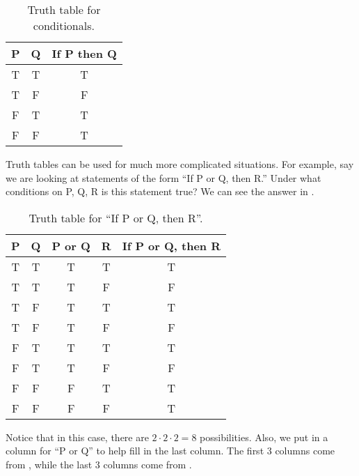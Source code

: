 \documentclass{tufte-book}
\begin{document}
\begin{table}
  \begin{center}
    \begin{tabular}{ccc}
      \toprule
      P & Q & If P then Q \\ \midrule
      T & T & T \\
      T & F & F \\
      F & T & T \\
      F & F & T \\ \bottomrule
    \end{tabular}
  \end{center}
  \caption{Truth table for conditionals.}
  \label{tab:truth-table-conditionals}
\end{table}
Truth tables can be used for much more complicated situations. For example, say we are looking at statements of the form ``If P or Q, then R.'' Under what conditions on P, Q, R is this statement true? We can see the answer in .

\begin{table}
  \begin{center}
    \begin{tabular}{ccccc}
      \toprule
      P & Q & P or Q & R & If P or Q, then R \\ \midrule
      T & T & T & T & T\\
      T & T & T & F & F\\
      T & F & T & T & T\\
      T & F & T & F & F\\ 
      F & T & T & T & T \\
      F & T & T & F & F \\
      F & F & F & T & T \\
      F & F & F & F & T \\
      \bottomrule
    \end{tabular}
  \end{center}
  \caption{Truth table for ``If P or Q, then R''.}
  \label{tab:truth-table-if-p-or-q-then-r}
\end{table}
Notice that in this case, there are $2 \cdot 2 \cdot 2 = 8$ possibilities. Also, we put in a column for ``P or Q'' to help fill in the last column. The first 3 columns come from , while the last 3 columns come from .
\end{document}
